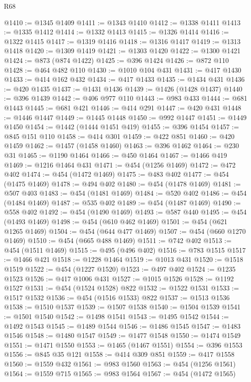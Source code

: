 \begin{lexlean}{R68}
\begin{coremodule}
@1410 := @1345 @1409
@1411 := @1343 @1410
@1412 := @1338 @1411
@1413 := @1335 @1412
@1414 := @1332 @1413
@1415 := @1326 @1414
@1416 := @1322 @1415
@1417 := @1319 @1416
@1418 := @1316 @1417
@1419 := @1313 @1418
@1420 := @1309 @1419
@1421 := @1303 @1420
@1422 := @1300 @1421
@1424 := @873 (@874 @1422)
@1425 := @396 @1424
@1426 := @872 @110
@1428 := @464 @482 @110
@1430 := @1010 @104 @431
@1431 := @417 @1430
@1433 := @414 @162 @432
@1434 := @417 @1433
@1435 := @1434 @431
@1436 := @420 @1435
@1437 := @1431 @1436
@1439 := @1426 (@1428 @1437)
@1440 := @396 @1439
@1442 := @406 @977 @110
@1443 := @983 @433
@1444 := @681 @1443
@1445 := @681 @421
@1446 := @414 @291
@1447 := @420 @431
@1448 := @1446 @1447
@1449 := @1445 @1448
@1450 := @992 @1447
@1451 := @1449 @1450
@1454 := @1442 (@1444 @1451 @419)
@1455 := @396 @1454
@1457 := @845 @151 @110
@1458 := @414 @301
@1459 := @422 @851
@1460 := @420 @1459
@1462 := @1457 (@1458 @1460)
@1463 := @396 @1462
@1464 := @230 @31
@1465 := @1190 @1464
@1466 := @450 @1464
@1467 := @1466 @419
@1469 := @1216 @1464 @431
@1471 := @454 (@1256 @1469)
@1472 := @472 @402
@1474 := @454 (@1472 @1469)
@1475 := @483 @402
@1477 := @454 (@1475 @1469)
@1478 := @494 @402
@1480 := @454 (@1478 @1469)
@1481 := @507 @403
@1483 := @454 (@1481 @1469)
@1484 := @520 @402
@1486 := @454 (@1484 @1469)
@1487 := @535 @402
@1489 := @454 (@1487 @1469)
@1490 := @558 @402
@1492 := @454 (@1490 @1469)
@1493 := @587 @440
@1495 := @454 (@1493 @1469)
@1498 := @454 (@610 @462 @1469)
@1501 := @454 (@621 @1265 @1469)
@1504 := @454 (@644 @477 @1469)
@1507 := @454 (@660 @1270 @1469)
@1510 := @454 (@665 @488 @1469)
@1511 := @742 @402
@1513 := @454 (@1511 @1469)
@1515 := @495 (@496 @402)
@1516 := @783 @1515
@1517 := @1466 @421
@1518 := @1228 @1464
@1519 := @1013 @431
@1520 := @1518 @1519
@1522 := @454 (@1227 @1520)
@1523 := @497 @402
@1524 := @1235 @1523
@1526 := @417 @1006 @431
@1527 := @1015 @1526
@1528 := @1192 @1527
@1531 := @454 (@1524 @1528) @822
@1532 := @1522 @1531
@1533 := @1517 @1532
@1536 := @454 (@1516 @1533) @822
@1537 := @1513 @1536
@1538 := @1510 @1537
@1539 := @1507 @1538
@1540 := @1504 @1539
@1541 := @1501 @1540
@1542 := @1498 @1541
@1543 := @1495 @1542
@1544 := @1492 @1543
@1545 := @1489 @1544
@1546 := @1486 @1545
@1547 := @1483 @1546
@1548 := @1480 @1547
@1549 := @1477 @1548
@1550 := @1474 @1549
@1551 := @1471 @1550
@1553 := @1465 (@1467 @1551)
@1554 := @396 @1553
@1556 := @845 @35 @121
@1558 := @414 @309 @851
@1559 := @417 @1558
@1560 := @1559 @432
@1561 := @983 @1560
@1563 := @454 (@1256 @1561)
@1564 := @1559 @715
@1565 := @983 @1564
@1567 := @454 (@1472 @1565)

\end{coremodule}
\end{lexlean}
